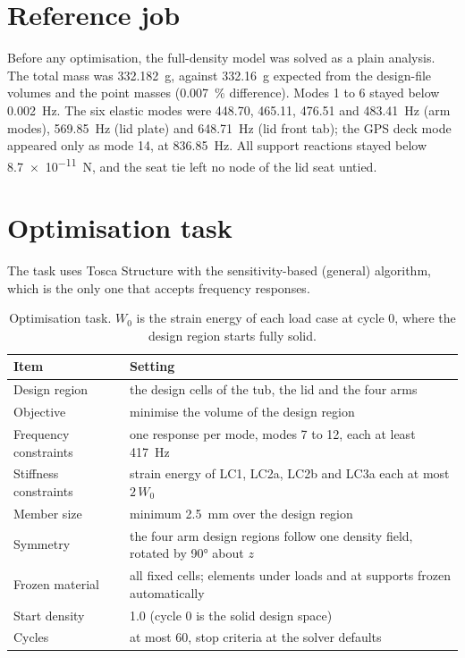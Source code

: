 \section{Reference job}\label{sec:optimisation_model-reference}

Before any optimisation, the full-density model was solved as a plain analysis. The total mass was \SI{332.182}{g}, against \SI{332.16}{g} expected from the design-file volumes and the point masses (\SI{0.007}{\percent} difference). Modes 1 to 6 stayed below \SI{0.002}{Hz}. The six elastic modes were \num{448.70}, \num{465.11}, \num{476.51} and \SI{483.41}{Hz} (arm modes), \SI{569.85}{Hz} (lid plate) and \SI{648.71}{Hz} (lid front tab); the GPS deck mode appeared only as mode 14, at \SI{836.85}{Hz}. All support reactions stayed below \SI{8.7e-11}{N}, and the seat tie left no node of the lid seat untied.

\section{Optimisation task}\label{sec:optimisation_model-task}

The task uses Tosca Structure with the sensitivity-based (general) algorithm, which is the only one that accepts frequency responses.

\begin{table}[htbp]
\centering\small
\caption{Optimisation task. $W_0$ is the strain energy of each load case at cycle 0, where the design region starts fully solid.}\label{tab:optimisation_model-task}
\begin{tabularx}{\linewidth}{@{}lX@{}}
\toprule
Item & Setting\\
\midrule
Design region & the design cells of the tub, the lid and the four arms\\
Objective & minimise the volume of the design region\\
Frequency constraints & one response per mode, modes 7 to 12, each at least \SI{417}{Hz}\\
Stiffness constraints & strain energy of LC1, LC2a, LC2b and LC3a each at most $2\,W_0$\\
Member size & minimum \SI{2.5}{mm} over the design region\\
Symmetry & the four arm design regions follow one density field, rotated by \ang{90} about $z$\\
Frozen material & all fixed cells; elements under loads and at supports frozen automatically\\
Start density & 1.0 (cycle 0 is the solid design space)\\
Cycles & at most 60, stop criteria at the solver defaults\\
\bottomrule
\end{tabularx}
\end{table}

